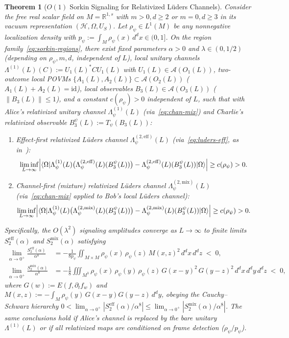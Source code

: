 \documentclass[11pt,a4paper]{article}
\newtheorem{theorem}{Theorem}[section]
\theoremstyle{definition}
\theoremstyle{remark}
\newcommand{\HH}{\mathcal{H}}
\newcommand{\Ac}{\mathcal{A}}
\newcommand{\RR}{\mathbb{R}}
\newcommand{\id}{\mathrm{id}}
\newcommand{\ket}[1]{|#1\rangle}
\newcommand{\bra}[1]{\langle #1|}
\newcommand{\norm}[1]{\|#1\|}
\begin{document}
\begin{theorem}[$O(1)$ Sorkin Signaling for Relativized L\"uders Channels]\label{thm:luders}
Consider the free real scalar field on $M=\RR^{1,s}$ with $m>0, d\ge 2$ or $m=0, d\ge 3$ in its vacuum representation $(\HH,\Omega,U_S)$. Let $\rho_\psi\in L^1(M)$ be any nonnegative localization density with $p_\psi := \int_M \rho_\psi(x)\,d^dx \in (0,1]$. On the region family~\eqref{eq:sorkin-regions}, there exist fixed parameters $\alpha > 0$ and $\lambda\in (0,1/2)$ (depending on $\rho_\psi, m, d$, independent of $L$), local unitary channels $\Lambda^{(1)}(L)(C) := U_1(L)^* C U_1(L)$ with $U_1(L)\in\Ac(O_1(L))$, two-outcome local POVMs $\{A_1(L), A_2(L)\}\subset\Ac(O_2(L))$ ($A_1(L)+A_2(L)=\id$), local observables $B_3(L)\in\Ac(O_3(L))$ ($\norm{B_3(L)}\le 1$), and a constant $c(\rho_\psi) > 0$ independent of $L$, such that with Alice's relativized unitary channel $\Lambda_\psi^{(1)}(L)$ (via~\eqref{eq:chan-mix}) and Charlie's relativized observable $B_3^\psi(L) := T_\psi(B_3(L))$:
\begin{enumerate}[label=\textup{(\alph*)},leftmargin=*]
\item \emph{Effect-first relativized L\"uders channel} $\Lambda_\psi^{(2,\mathrm{eff})}(L)$ (via~\eqref{eq:luders-eff}, as in~\cite[Cor.~4.7]{FewsterLoveridge2026}):
\[
\liminf_{L\to\infty}\Bigl|\bra{\Omega}\Lambda_\psi^{(1)}(L)\bigl(\Lambda_\psi^{(2,\mathrm{eff})}(L)(B_3^\psi(L))\bigr) - \Lambda_\psi^{(2,\mathrm{eff})}(L)(B_3^\psi(L))\ket{\Omega}\Bigr| \ge c(\rho_\psi) > 0.
\]
\item \emph{Channel-first (mixture) relativized L\"uders channel} $\Lambda_\psi^{(2,\mathrm{mix})}(L)$ (via~\eqref{eq:chan-mix} applied to Bob's local L\"uders channel):
\[
\liminf_{L\to\infty}\Bigl|\bra{\Omega}\Lambda_\psi^{(1)}(L)\bigl(\Lambda_\psi^{(2,\mathrm{mix})}(L)(B_3^\psi(L))\bigr) - \Lambda_\psi^{(2,\mathrm{mix})}(L)(B_3^\psi(L))\ket{\Omega}\Bigr| \ge c(\rho_\psi) > 0.
\]
\end{enumerate}
Specifically, the $O(\lambda^2)$ signaling amplitudes converge as $L\to\infty$ to finite limits $S_2^{\mathrm{eff}}(\alpha)$ and $S_2^{\mathrm{mix}}(\alpha)$ satisfying
\begin{align}
\lim_{\alpha\to 0^+}\frac{S_2^{\mathrm{eff}}(\alpha)}{\alpha^8}
&= -\frac{1}{8p_\psi}\iint_{M\times M}\rho_\psi(x)\,\rho_\psi(z)\,M(x,z)^2\,d^dx\,d^dz \;<\; 0, \label{eq:S2-eff}\\
\lim_{\alpha\to 0^+}\frac{S_2^{\mathrm{mix}}(\alpha)}{\alpha^8}
&= -\frac{1}{8}\iiint_{M^3}\rho_\psi(x)\,\rho_\psi(y)\,\rho_\psi(z)\,G(x-y)^2\,G(y-z)^2\,d^dx\,d^dy\,d^dz \;<\; 0, \label{eq:S2-mix}
\end{align}
where $G(w) := E(f, \partial_t f_w)$ and $M(x,z) := -\int_M \rho_\psi(y)\,G(x-y)G(y-z)\,d^dy$, obeying the Cauchy--Schwarz hierarchy $0 < \lim_{\alpha\to 0^+}|S_2^{\mathrm{eff}}(\alpha)/\alpha^8| \le \lim_{\alpha\to 0^+}|S_2^{\mathrm{mix}}(\alpha)/\alpha^8|$. The same conclusions hold if Alice's channel is replaced by the bare unitary $\Lambda^{(1)}(L)$ or if all relativized maps are conditioned on frame detection ($\rho_\psi/p_\psi$).
\end{theorem}
\end{document}
